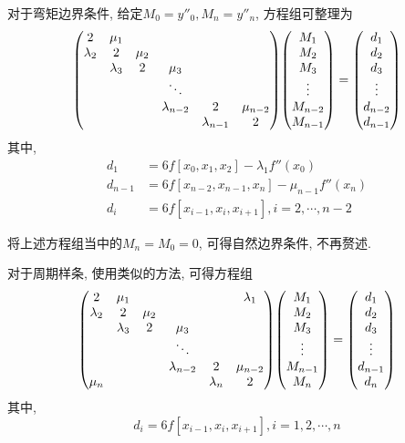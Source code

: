 对于弯矩边界条件, 给定$M_0=y''_0,M_n=y''_n$, 方程组可整理为
\begin{equation*}
    \mqty(
        2&\mu_1&&&&\\
        \lambda_2&2&\mu_2&&&\\
        &\lambda_3&2&\mu_3&&\\
        &&&\ddots&&\\
        &&&\lambda_{n-2}&2&\mu_{n-2}\\
        &&&&\lambda_{n-1}&2
    )\mqty(M_1\\M_2\\M_3\\\vdots\\M_{n-2}\\M_{n-1})=\mqty(d_1\\d_2\\d_3\\\vdots\\d_{n-2}\\d_{n-1})
\end{equation*}
其中, 
\begin{align*}
    d_1&=6f[x_0,x_1,x_2]-\lambda_1f''(x_0)\\
    d_{n-1}&=6f[x_{n-2},x_{n-1},x_n]-\mu_{n-1}f''(x_n)\\
    d_i&=6f[x_{i-1},x_i,x_{i+1}],i=2,\cdots,n-2
\end{align*}

将上述方程组当中的$M_n=M_0=0$, 可得自然边界条件, 不再赘述.

对于周期样条, 使用类似的方法, 可得方程组
\begin{equation*}
    \mqty(
        2&\mu_1&&&&\lambda_1\\
        \lambda_2&2&\mu_2&&&\\
        &\lambda_3&2&\mu_3&&\\
        &&&\ddots&&\\
        &&&\lambda_{n-2}&2&\mu_{n-2}\\
        \mu_n&&&&\lambda_n&2\\
    )\mqty(M_1\\M_2\\M_3\\\vdots\\M_{n-1}\\M_n)=\mqty(d_1\\d_2\\d_3\\\vdots\\d_{n-1}\\d_n)
\end{equation*}
其中,
\begin{equation*}
    d_i=6f[x_{i-1},x_i,x_{i+1}], i=1,2,\cdots,n
\end{equation*}

